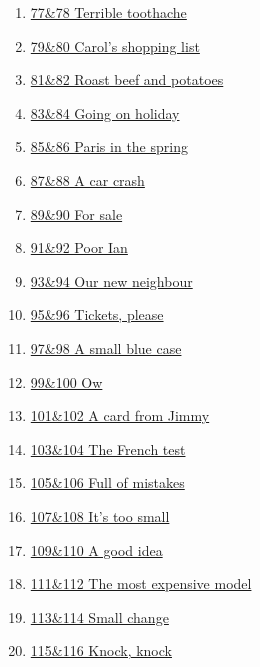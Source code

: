 \documentclass[11pt]{article}
\begin{document}
\begin{multicols}{2}
\begin{enumerate}
		\item \href{https://mp.weixin.qq.com/s/FOky-kSqk8ZL64Q4UGAihw}{77\&78 Terrible toothache}	%
		\item \href{https://mp.weixin.qq.com/s/FteZx3rasuoHt0UJ5P5pPA}{79\&80 Carol's shopping list}	%
		\item \href{https://mp.weixin.qq.com/s/GVD1rLmalBGDUe3DJJr3-g}{81\&82 Roast beef and potatoes}	%
		\item \href{https://mp.weixin.qq.com/s/bhOPlpIBrxOpJ02lruw3kQ}{83\&84 Going on holiday}	%
		\item \href{https://mp.weixin.qq.com/s/eN3uIOpJqNIe936Rk2STkg}{85\&86 Paris in the spring}	%
		\item \href{https://mp.weixin.qq.com/s/nGHCxaoDVcuNkVKr_7RJbQ}{87\&88 A car crash}	%
		\item \href{https://mp.weixin.qq.com/s/wDbkWhEHC4vJneNqq42-wQ}{89\&90 For sale}	%
		\item \href{https://mp.weixin.qq.com/s/xwf_5oep4FuGuI1tzRuoKQ}{91\&92 Poor Ian}	%
		\item \href{https://mp.weixin.qq.com/s/ghNZ9D2HtNWQZWIwED1tWA}{93\&94 Our new neighbour}	%
		\item \href{https://mp.weixin.qq.com/s/maoCkCnEaPFTMzabduogCw}{95\&96 Tickets, please}	%
		\item \href{https://mp.weixin.qq.com/s/m3u3gUDw_D1oRdtQfMYWMQ}{97\&98 A small blue case}	%
		\item \href{https://mp.weixin.qq.com/s/ggj9Y9NzB3s4QmSSNLAblw}{99\&100 Ow}	%
		\item \href{https://mp.weixin.qq.com/s/sgVs80UkjdQyjL2UsvTyxw}{101\&102 A card from Jimmy}	%
		\item \href{https://mp.weixin.qq.com/s/CT8W-PFcScdKO4cw4rXqhQ}{103\&104 The French test}	%
		\item \href{https://mp.weixin.qq.com/s/qY351kq1vH4NqI2Rbjpvfg}{105\&106 Full of mistakes}	%
		\item \href{https://mp.weixin.qq.com/s/LdFWTOIn_VYJzW5P6orIqg}{107\&108 It's too small}	%
		\item \href{https://mp.weixin.qq.com/s/FsN7TYfcqFsKa9Jr5BxY2w}{109\&110 A good idea}	%
		\item \href{https://mp.weixin.qq.com/s/gS0Al989ld48SsPP9n0KYQ}{111\&112 The most expensive model}	%
		\item \href{https://mp.weixin.qq.com/s/tpTseTIWT9QB1zm0IYpg9A}{113\&114 Small change}	%
		\item \href{https://mp.weixin.qq.com/s/PgzzpG-OR5KMoQ7OlYUzkQ}{115\&116 Knock, knock}	%

\end{enumerate}
\end{multicols}
\end{document}
